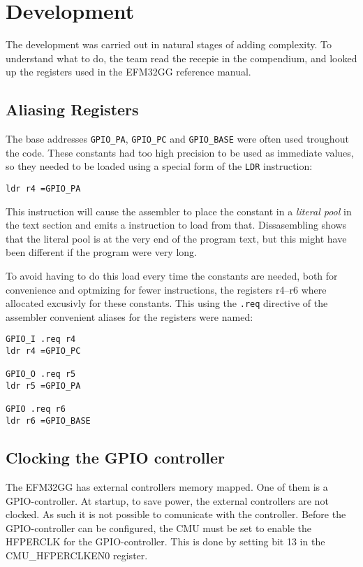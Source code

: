 \section{Development}
The development was carried out in natural stages of adding complexity.
To understand what to do, the team read the recepie in the compendium, and looked up the registers used in the EFM32GG reference manual.

\subsection{Aliasing Registers}
The base addresses \texttt{GPIO\_PA}, \texttt{GPIO\_PC} and \texttt{GPIO\_BASE} were often used troughout the code.
These constants had too high precision to be used as immediate values, so they needed to be loaded using a special form of the \texttt{LDR} instruction:

\begin{verbatim}
ldr r4 =GPIO_PA
\end{verbatim}

This instruction will cause the assembler to place the constant in a \emph{literal pool} in the text section and emits a instruction to load from that.
Dissasembling shows that the literal pool is at the very end of the program text, but this might have been different if the program were very long.

To avoid having to do this load every time the constants are needed, both for convenience and optmizing for fewer instructions, the registers r4--r6 where allocated excusivly for these constants.
This using the \texttt{.req} directive of the assembler convenient aliases for the registers were named:

\begin{verbatim}
GPIO_I .req r4
ldr r4 =GPIO_PC

GPIO_O .req r5
ldr r5 =GPIO_PA

GPIO .req r6
ldr r6 =GPIO_BASE
\end{verbatim}


\subsection{Clocking the GPIO controller}
The EFM32GG has external controllers memory mapped.
One of them is a GPIO-controller.
At startup, to save power, the external controllers are not clocked.
As such it is not possible to comunicate with the controller.
Before the GPIO-controller can be configured, the CMU must be set to enable the HFPERCLK for the GPIO-controller.
This is done by setting bit 13 in the CMU\_HFPERCLKEN0 register.

